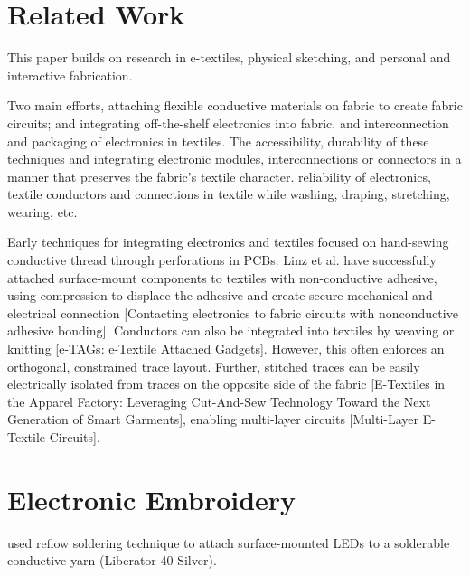 \section{Related Work}
This paper builds on research in e-textiles, physical sketching, and personal and interactive fabrication.

Two main efforts, attaching flexible conductive materials on fabric to create fabric circuits; and integrating off-the-shelf electronics into fabric. and interconnection and packaging of electronics in textiles.
The accessibility, durability of these techniques and integrating electronic modules, interconnections or connectors in a manner that preserves the fabric's textile character. reliability of electronics, textile conductors and connections in textile while washing, draping, stretching, wearing, etc. \cite{linz2008embroidered}

Early techniques for integrating electronics and textiles focused on hand-sewing conductive thread through perforations in PCBs. Linz et al. have successfully attached surface-mount components to textiles with non-conductive adhesive, using compression to displace the adhesive and create secure mechanical and electrical connection [Contacting electronics to fabric circuits with nonconductive
adhesive bonding]. Conductors can also be integrated into textiles by weaving or knitting [e-TAGs: e-Textile Attached Gadgets]. However, this often enforces an orthogonal, constrained trace layout. Further, stitched traces can be easily electrically isolated from traces on the opposite side of the fabric [E-Textiles in the Apparel Factory:
Leveraging Cut-And-Sew Technology Toward the Next
Generation of Smart Garments], enabling multi-layer circuits [Multi-Layer E-Textile Circuits].




\section{Electronic Embroidery}

\cite{Berglund:2015:SCA:2802083.2808413} used reflow soldering technique to attach surface-mounted LEDs to a solderable conductive yarn (Liberator 40 Silver). 

